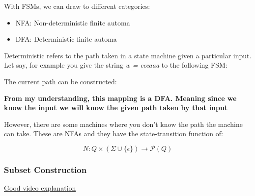 \documentclass{article}[article]
\begin{document}
With FSMs, we can draw to different categories:

\begin{itemize}
\item NFA: Non-deterministic finite automa
\item DFA: Deterministic finite automa
\end{itemize}

Deterministic refers to the path taken in a state machine given a particular input.
Let say, for example you give the string \emph{w = cccaaa} to the following FSM:

\begin{center}\end{center}

The current path can be constructed:

\begin{center}\end{center}

\textbf{From my understanding, this mapping is a DFA. Meaning since we know the input we will know the given path taken by that input}

However, there are some machines where you don't know the path the machine can take.
These are NFAs and they have the state-transition function of:

$$N: Q \times (\Sigma \cup \{\epsilon\}) \rightarrow \mathcal{P}(Q)$$


\subsubsection{Subset Construction}

\href{https://www.youtube.com/watch?v=wYi3ThfLets}{Good video explanation}
\end{document}
